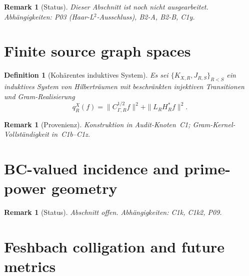 \documentclass[12pt,a4paper]{amsart}
\newtheorem{definition}[theorem]{Definition}
\newtheorem{remark}[theorem]{Remark}
\newcommand{\KXR}{K_{X,R}}
\newcommand{\JRS}{J_{R,S}}
\newcommand{\CRG}{C_{\Gamma,R}}
\newcommand{\HR}{H_R}
\newcommand{\LR}{L_R}
\begin{document}
\begin{remark}[Status]
  Dieser Abschnitt ist noch nicht ausgearbeitet.
  Abhängigkeiten: P03 (Haar-L$^2$-Ausschluss), B2-A, B2-B, C1y.
\end{remark}

\section{Finite source graph spaces}
\label{sec:source-graphs}


\begin{definition}[Kohärentes induktives System]
  \label{def:ind-system}
  Es sei $\{\KXR, \JRS\}_{R < S}$ ein induktives System von
  Hilberträumen mit beschränkten injektiven Transitionen und
  Gram-Realisierung
  \[
    q_R^X(f) = \|\CRG^{1/2} f\|^2 + \|\LR \HR^* f\|^2.
  \]
\end{definition}

\begin{remark}[Provenienz]
  Konstruktion in Audit-Knoten~C1; Gram-Kernel-Vollständigkeit
  in~C1b--C1z.
\end{remark}

\section{BC-valued incidence and prime-power geometry}
\label{sec:bc-geometry}


\begin{remark}[Status]
  Abschnitt offen. Abhängigkeiten: C1k, C1k2, P09.
\end{remark}

\section{Feshbach colligation and future metrics}
\label{sec:feshbach}
\end{document}
